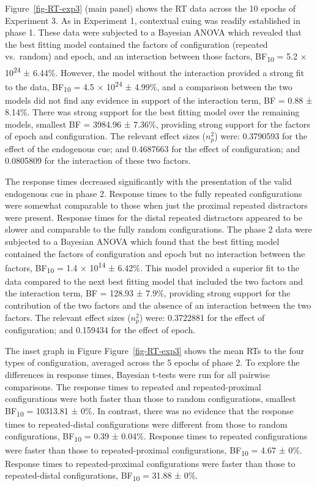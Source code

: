 \documentclass[
  man,
  floatsintext,
  longtable,
  nolmodern,
  notxfonts,
  notimes,
  colorlinks=true,linkcolor=blue,citecolor=blue,urlcolor=blue]{apa7}
\begin{document}
Figure~\ref{fig-RT-exp3} (main panel) shows the RT data across the 10
epochs of Experiment 3. As in Experiment 1, contextual cuing was readily
established in phase 1. These data were subjected to a Bayesian ANOVA
which revealed that the best fitting model contained the factors of
configuration (repeated vs.~random) and epoch, and an interaction
between those factors, BF\textsubscript{10} = 5.2 ×
10\textsuperscript{24} ± 6.44\%. However, the model without the
interaction provided a strong fit to the data, BF\textsubscript{10} =
4.5 × 10\textsuperscript{24} ± 4.99\%, and a comparison between the two
models did not find any evidence in support of the interaction term, BF
= 0.88 ± 8.14\%. There was strong support for the best fitting model
over the remaining models, smallest BF = 3984.96 ± 7.36\%, providing
strong support for the factors of epoch and configuration. The relevant
effect sizes (\(n^2_p\)) were: 0.3790593 for the effect of the
endogenous cue; and 0.4687663 for the effect of configuration; and
0.0805809 for the interaction of these two factors.

The response times decreased significantly with the presentation of the
valid endogenous cue in phase 2. Response times to the fully repeated
configurations were somewhat comparable to those when just the proximal
repeated distractors were present. Response times for the distal
repeated distractors appeared to be slower and comparable to the fully
random configurations. The phase 2 data were subjected to a Bayesian
ANOVA which found that the best fitting model contained the factors of
configuration and epoch but no interaction between the factors,
BF\textsubscript{10} = 1.4 × 10\textsuperscript{14} ± 6.42\%. This model
provided a superior fit to the data compared to the next best fitting
model that included the two factors and the interaction term, BF =
128.93 ± 7.9\%, providing strong support for the contribution of the two
factors and the absence of an interaction between the two factors. The
relevant effect sizes (\(n^2_p\)) were: 0.3722881 for the effect of
configuration; and 0.159434 for the effect of epoch.

The inset graph in Figure Figure~\ref{fig-RT-exp3} shows the mean RTs to
the four types of configuration, averaged across the 5 epochs of phase
2. To explore the differences in response times, Bayesian t-tests were
run for all pairwise comparisons. The response times to repeated and
repeated-proximal configurations were both faster than those to random
configurations, smallest BF\textsubscript{10} = 10313.81 ± 0\%. In
contrast, there was no evidence that the response times to
repeated-distal configurations were different from those to random
configurations, BF\textsubscript{10} = 0.39 ± 0.04\%. Response times to
repeated configurations were faster than those to repeated-proximal
configurations, BF\textsubscript{10} = 4.67 ± 0\%. Response times to
repeated-proximal configurations were faster than those to
repeated-distal configurations, BF\textsubscript{10} = 31.88 ± 0\%.
\end{document}
